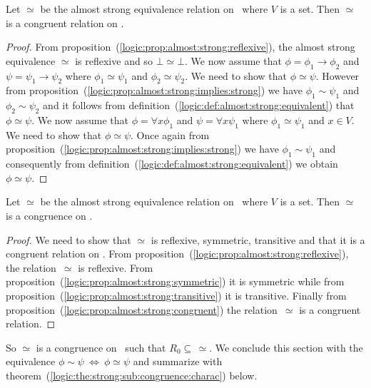 \begin{prop}\label{logic:prop:almost:strong:congruent}
Let $\simeq$ be the almost strong equivalence relation on \pv\ where
$V$ is a set. Then $\simeq$ is a congruent relation on \pv.
\end{prop}
\begin{proof}
From proposition~(\ref{logic:prop:almost:strong:reflexive}), the
almost strong equivalence $\simeq$ is reflexive and so
$\bot\simeq\bot$. We now assume that $\phi=\phi_{1}\to\phi_{2}$ and
$\psi=\psi_{1}\to\psi_{2}$ where $\phi_{1}\simeq\psi_{1}$ and
$\phi_{2}\simeq\psi_{2}$. We need to show that $\phi\simeq\psi$.
However from
proposition~(\ref{logic:prop:almost:strong:implies:strong}) we have
$\phi_{1}\sim\psi_{1}$ and $\phi_{2}\sim\psi_{2}$ and it follows
from definition~(\ref{logic:def:almost:strong:equivalent}) that
$\phi\simeq\psi$. We now assume that $\phi=\forall x\phi_{1}$ and
$\psi=\forall x\psi_{1}$ where $\phi_{1}\simeq\psi_{1}$ and $x\in
V$. We need to show that $\phi\simeq\psi$. Once again from
proposition~(\ref{logic:prop:almost:strong:implies:strong}) we have
$\phi_{1}\sim\psi_{1}$ and consequently from
definition~(\ref{logic:def:almost:strong:equivalent}) we obtain
$\phi\simeq\psi$.
\end{proof}


\begin{prop}\label{logic:prop:almost:strong:congruence}
Let $\simeq$ be the almost strong equivalence relation on \pv\ where
$V$ is a set. Then $\simeq$ is a congruence on \pv.
\end{prop}
\begin{proof}
We need to show that $\simeq$ is reflexive, symmetric, transitive
and that it is a congruent relation on \pv. From
proposition~(\ref{logic:prop:almost:strong:reflexive}), the
relation~$\simeq$ is reflexive. From
proposition~(\ref{logic:prop:almost:strong:symmetric}) it is
symmetric while from
proposition~(\ref{logic:prop:almost:strong:transitive}) it is
transitive. Finally from
proposition~(\ref{logic:prop:almost:strong:congruent}) the
relation~$\simeq$ is a congruent relation.
\end{proof}

So $\simeq$ is a congruence on \pv\ such that
$R_{0}\subseteq\,\simeq$. We conclude this section with the
equivalence $\phi\sim\psi\ \Leftrightarrow\ \phi\simeq\psi$ and
summarize with
theorem~(\ref{logic:the:strong:sub:congruence:charac}) below.


